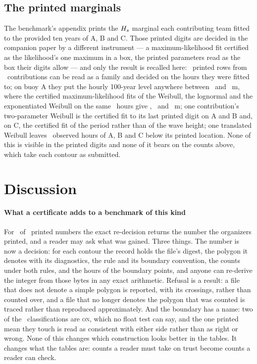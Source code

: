 \documentclass[preprint,11pt,authoryear]{elsarticle}
\begin{document}
\subsection{The printed marginals}
The benchmark's appendix prints the $H_s$ marginal each contributing team fitted to the provided ten years of A, B and C. Those printed digits are decided in the companion paper \citep{toledo2026} by a different instrument --- a maximum-likelihood fit certified as the likelihood's one maximum in a box, the printed parameters read as the box their digits allow --- and only the result is recalled here: \PRows\ printed rows from \PContributions\ contributions can be read as a family and decided on the hours they were fitted to; on buoy A they put the hourly 100-year level anywhere between \PSpreadLo\ and \PSpreadHi\ m, where the certified maximum-likelihood fits of the Weibull, the lognormal and the exponentiated Weibull on the same \PRefAN\ hours give \PRefAWeibull, \PRefALognormal\ and \PRefAEw\ m; one contribution's two-parameter Weibull is the certified fit to its last printed digit on A and B and, on C, the certified fit of the period rather than of the wave height; one translated Weibull leaves \PCNineBelow\ observed hours of A, B and C below its printed location. None of this is visible in the printed digits and none of it bears on the counts above, which take each contour as submitted.

\section{Discussion}\label{sec:discussion}

\paragraph{What a certificate adds to a benchmark of this kind}
For \EExact\ of \EComparisons\ printed numbers the exact re-decision returns the number the organizers printed, and a reader may ask what was gained. Three things. The number is now a decision: for each contour the record holds the file's digest, the polygon it denotes with its diagnostics, the rule and its boundary convention, the counts under both rules, and the hours of the boundary points, and anyone can re-derive the integer from those bytes in any exact arithmetic. Refusal is a result: a file that does not denote a simple polygon is reported, with its crossings, rather than counted over, and a file that no longer denotes the polygon that was counted is traced rather than reproduced approximately. And the boundary has a name: two of the \EHoursTotal\ classifications are \textsc{on}, which no float test can say, and the one printed mean they touch is read as consistent with either side rather than as right or wrong. None of this changes which construction looks better in the tables. It changes what the tables are: counts a reader must take on trust become counts a reader can check.
\end{document}
